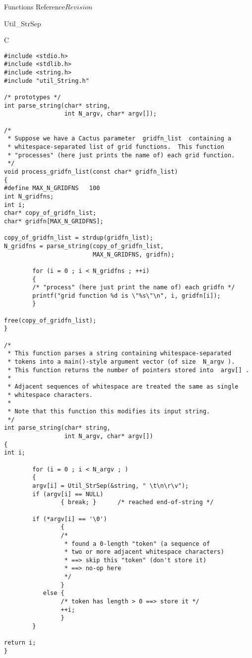 \begin{cactuspart}{ Functions Reference}{}{$Revision$}
\begin{FunctionDescription}{Util\_StrSep}
\begin{ExampleSection}
\begin{Example}{C}
\begin{verbatim}
#include <stdio.h>
#include <stdlib.h>
#include <string.h>
#include "util_String.h"

/* prototypes */
int parse_string(char* string,
                 int N_argv, char* argv[]);

/*
 * Suppose we have a Cactus parameter  gridfn_list  containing a
 * whitespace-separated list of grid functions.  This function
 * "processes" (here just prints the name of) each grid function.
 */
void process_gridfn_list(const char* gridfn_list)
{
#define MAX_N_GRIDFNS   100
int N_gridfns;
int i;
char* copy_of_gridfn_list;
char* gridfn[MAX_N_GRIDFNS];

copy_of_gridfn_list = strdup(gridfn_list);
N_gridfns = parse_string(copy_of_gridfn_list,
                         MAX_N_GRIDFNS, gridfn);

        for (i = 0 ; i < N_gridfns ; ++i)
        {
        /* "process" (here just print the name of) each gridfn */
        printf("grid function %d is \"%s\"\n", i, gridfn[i]);
        }

free(copy_of_gridfn_list);
}

/*
 * This function parses a string containing whitespace-separated
 * tokens into a main()-style argument vector (of size  N_argv ).
 * This function returns the number of pointers stored into  argv[] .
 *
 * Adjacent sequences of whitespace are treated the same as single
 * whitespace characters.
 *
 * Note that this function this modifies its input string.
 */
int parse_string(char* string,
                 int N_argv, char* argv[])
{
int i;

        for (i = 0 ; i < N_argv ; )
        {
        argv[i] = Util_StrSep(&string, " \t\n\r\v");
        if (argv[i] == NULL)
                { break; }      /* reached end-of-string */

        if (*argv[i] == '\0')
                {
                /*
                 * found a 0-length "token" (a sequence of
                 * two or more adjacent whitespace characters)
                 * ==> skip this "token" (don't store it)
                 * ==> no-op here
                 */
                }
           else {
                /* token has length > 0 ==> store it */
                ++i;
                }
        }

return i;
}
\end{verbatim}
\end{Example}
\end{ExampleSection}
\end{FunctionDescription}


\end{cactuspart}
